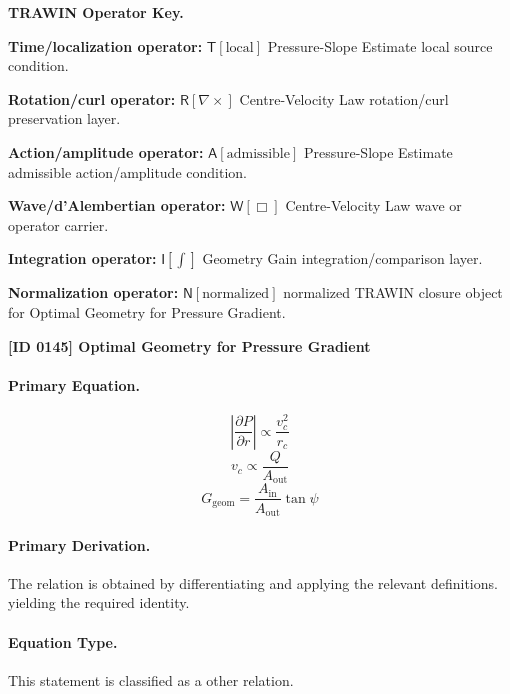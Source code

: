\par\vspace{0.45\baselineskip}
\noindent\begin{minipage}[t]{\linewidth}
\begingroup
\small
\raggedright
\textbf{TRAWIN Operator Key.}\par
\noindent\textbf{Time/localization operator:} $\mathsf{T}\!\left[\mathrm{local}\right]$ Pressure-Slope Estimate local source condition.\par
\noindent\textbf{Rotation/curl operator:} $\mathsf{R}\!\left[\nabla\times\right]$ Centre-Velocity Law rotation/curl preservation layer.\par
\noindent\textbf{Action/amplitude operator:} $\mathsf{A}\!\left[\mathrm{admissible}\right]$ Pressure-Slope Estimate admissible action/amplitude condition.\par
\noindent\textbf{Wave/d'Alembertian operator:} $\mathsf{W}\!\left[\Box\right]$ Centre-Velocity Law wave or operator carrier.\par
\noindent\textbf{Integration operator:} $\mathsf{I}\!\left[\int\right]$ Geometry Gain integration/comparison layer.\par
\noindent\textbf{Normalization operator:} $\mathsf{N}\!\left[\mathrm{normalized}\right]$ normalized TRAWIN closure object for Optimal Geometry for Pressure Gradient.\par
\endgroup
\end{minipage}

\clearpage
\noindent\textbf{[ID 0145] Optimal Geometry for Pressure Gradient}\par
\vspace{0.35em}
\paragraph{Primary Equation.}
\[
\left|\frac{\partial P}{\partial r}\right|\propto \frac{v_c^2}{r_c}
\]
\[
v_c\propto \frac{Q}{A_{\mathrm{out}}}
\]
\[
G_{\mathrm{geom}}=\frac{A_{\mathrm{in}}}{A_{\mathrm{out}}}\tan\psi
\]

\paragraph{Primary Derivation.}
The relation is obtained by differentiating and applying the relevant definitions. yielding the required identity.
\paragraph{Equation Type.}
This statement is classified as a other relation.

